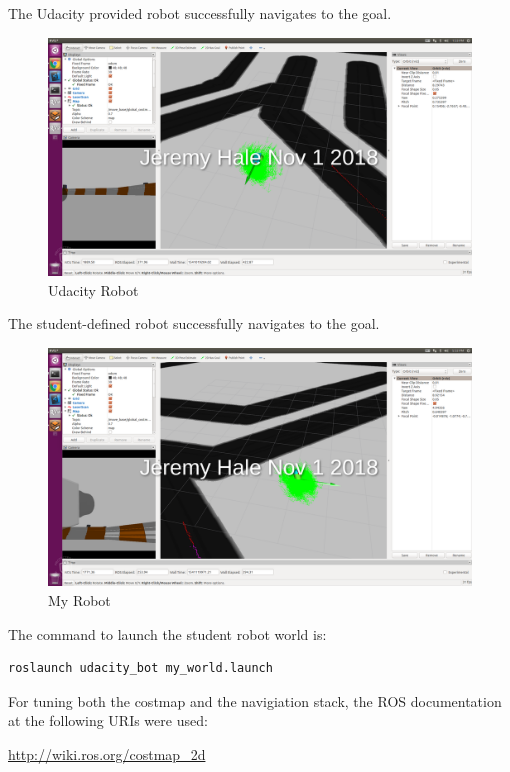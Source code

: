 \documentclass[10pt,journal,compsoc]{IEEEtran}
\begin{document}
The Udacity provided robot successfully navigates to the goal.
\begin{figure}[thpb]
      \centering
      \includegraphics[width=\linewidth]{udacity_bot_goal_close}
      \caption{Udacity Robot}
      \label{fig:robot2}
\end{figure}

The student-defined robot successfully navigates to the goal.

\begin{figure}[thpb]
      \centering
      \includegraphics[width=\linewidth]{my_bot_rvis}
      \caption{My Robot}
      \label{fig:robot3}
\end{figure}

The command to launch the student robot world is:
\begin{lstlisting}[language=Bash]
roslaunch udacity_bot my_world.launch
\end{lstlisting}

For tuning both the costmap and the navigiation stack, the ROS documentation at the following URIs were used:

\url{http://wiki.ros.org/costmap\_2d}
\end{document}
